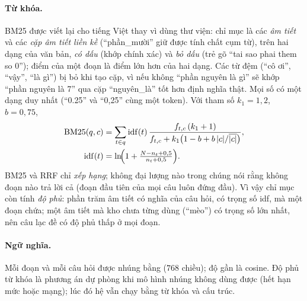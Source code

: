 \paragraph{Từ khóa.} BM25 được viết lại cho tiếng Việt thay vì dùng thư viện: chỉ mục là các \emph{âm tiết} và các \emph{cặp âm tiết liền kề} (``phần\_mười'' giữ được tính chất cụm từ), trên hai dạng của văn bản, \emph{có dấu} (khớp chính xác) và \emph{bỏ dấu} (trẻ gõ ``tai sao phai them so 0''); điểm của một đoạn là điểm lớn hơn của hai dạng. Các từ đệm (``cô ơi'', ``vậy'', ``là gì'') bị bỏ khi tạo cặp, vì nếu không ``phần nguyên là gì'' sẽ khớp ``phần nguyên là 7'' qua cặp ``nguyên\_là'' tốt hơn định nghĩa thật. Mọi số có một dạng duy nhất (``0.25'' và ``0,25'' cùng một token). Với tham số $k_1=1{,}2$, $b=0{,}75$,
\begin{equation}
\begin{split}
\mathrm{BM25}(q,c)&=\sum_{t\in q}\mathrm{idf}(t)\,\frac{f_{t,c}\,(k_1+1)}{f_{t,c}+k_1\bigl(1-b+b\,|c|/\overline{|c|}\bigr)},\\
\mathrm{idf}(t)&=\ln\!\Bigl(1+\tfrac{N-n_t+0{,}5}{n_t+0{,}5}\Bigr).
\end{split}
\end{equation}
BM25 và RRF chỉ \emph{xếp hạng}; không đại lượng nào trong chúng nói rằng không đoạn nào trả lời cả (đoạn đầu tiên của mọi câu luôn đứng đầu). Vì vậy chỉ mục còn tính \emph{độ phủ}: phần trăm âm tiết có nghĩa của câu hỏi, có trọng số idf, mà một đoạn chứa; một âm tiết mà kho chưa từng dùng (``mèo'') có trọng số lớn nhất, nên câu lạc đề có độ phủ thấp ở mọi đoạn.

\paragraph{Ngữ nghĩa.} Mỗi đoạn và mỗi câu hỏi được nhúng bằng  ($768$ chiều); độ gần là cosine. Độ phủ từ khóa là phương án dự phòng khi mô hình nhúng không dùng được (hết hạn mức hoặc mạng); lúc đó hệ vẫn chạy bằng từ khóa và cấu trúc.

